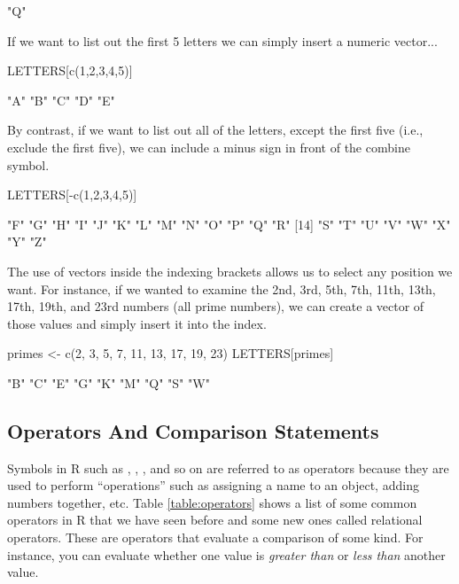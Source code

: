 \begin{outR}
[1] "Q"
\end{outR}

\noindent
If we want to list out the first 5 letters we can simply insert a numeric vector...
\begin{inR}
LETTERS[c(1,2,3,4,5)]
\end{inR}

\begin{outR}
[1] "A" "B" "C" "D" "E"
\end{outR}

\noindent
By contrast, if we want to list out all of the letters, except the first five (i.e., exclude the first five), we can include a minus sign in front of the combine symbol.

\begin{inR}
LETTERS[-c(1,2,3,4,5)]
\end{inR}

\begin{outR}
[1] "F" "G" "H" "I" "J" "K" "L" "M" "N" "O" "P" "Q" "R"
[14] "S" "T" "U" "V" "W" "X" "Y" "Z"
\end{outR}

\noindent
The use of vectors inside the indexing brackets allows us to select any position we want.  For instance, if we wanted to examine the 2nd, 3rd, 5th, 7th, 11th, 13th, 17th, 19th, and 23rd numbers (all prime numbers), we can create a vector of those values and simply insert it into the index. 

\begin{inR}
primes <- c(2, 3, 5, 7, 11, 13, 17, 19, 23)
LETTERS[primes]
\end{inR}

\begin{outR}
[1] "B" "C" "E" "G" "K" "M" "Q" "S" "W"
\end{outR}


\subsection{Operators And Comparison Statements}
\label{sec:operatorsAndCompair}

Symbols in R such as \R{<-}, \R{+}, \R{-}, and so on are referred to as operators because they are used to perform ``operations'' such as assigning a name to an object, adding numbers together, etc.  Table \ref{table:operators} shows a list of some common operators in R that we have seen before and some new ones called \glspl{relational operator}.  These are operators that evaluate a comparison of some kind.  For instance, you can evaluate whether one value is \textit{greater than} or \textit{less than} another value.

